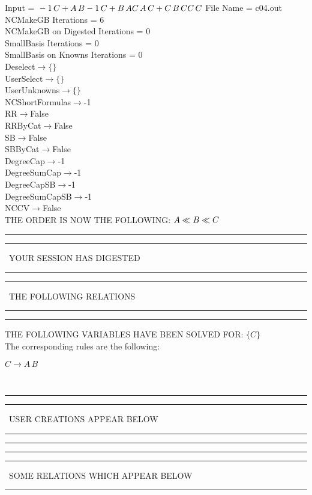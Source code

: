 \documentclass[rep10,leqno]{report}
\begin{document}
\normalsize
\baselineskip=12pt
\noindent
Input = 
$
\\-1\,
 C + A\,
 B\\
-1\,
 C + B\,
 A\\
C\,
 A\,
 C + C\,
 B\,
 C\\
C\,
 C\\
$
File Name = c04.out\\
NCMakeGB Iterations = 6\\
NCMakeGB on Digested Iterations = 0\\
SmallBasis Iterations = 0\\
SmallBasis on Knowns Iterations = 0\\
Deselect$\rightarrow \{\}$\\
UserSelect$\rightarrow \{\}$\\
UserUnknowns$\rightarrow \{\}$\\
NCShortFormulas$\rightarrow$-1\\
RR$\rightarrow $False\\
RRByCat$\rightarrow $False\\
SB$\rightarrow $False\\
SBByCat$\rightarrow $False\\
DegreeCap$\rightarrow $-1\\
DegreeSumCap$\rightarrow $-1\\
DegreeCapSB$\rightarrow $-1\\
DegreeSumCapSB$\rightarrow $-1\\
NCCV$\rightarrow $False\\
THE ORDER IS NOW THE FOLLOWING:\hfil\break
$
A\ll
B\ll
C\\
$
\rule[2pt]{6in}{4pt}\hfil\break
\rule[2pt]{1.879in}{4pt}
\ YOUR SESSION HAS DIGESTED\ 
\rule[2pt]{1.879in}{4pt}\hfil\break
\rule[2pt]{1.923in}{4pt}
\ THE FOLLOWING RELATIONS\ 
\rule[2pt]{1.923in}{4pt}\hfil\break
\rule[2pt]{6in}{4pt}\hfil\break
THE FOLLOWING VARIABLES HAVE BEEN SOLVED FOR:\hfil\break
$\{C\}$
\smallskip\\
The corresponding rules are the following:\smallskip\\
\begin{minipage}{6in}
$
C\rightarrow A\,
 B
$
\end{minipage}\medskip\\
\rule[2pt]{6in}{1pt}\hfil\break
\rule[2.5pt]{1.701in}{1pt}
\ USER CREATIONS APPEAR BELOW\ 
\rule[2.5pt]{1.701in}{1pt}\hfil\break
\rule[2pt]{6in}{1pt}\hfil\break
\rule[2pt]{6in}{4pt}\hfil\break
\rule[2pt]{1.45in}{4pt}
\ SOME RELATIONS WHICH APPEAR BELOW\ 
\rule[2pt]{1.45in}{4pt}\hfil\break
\end{document}
